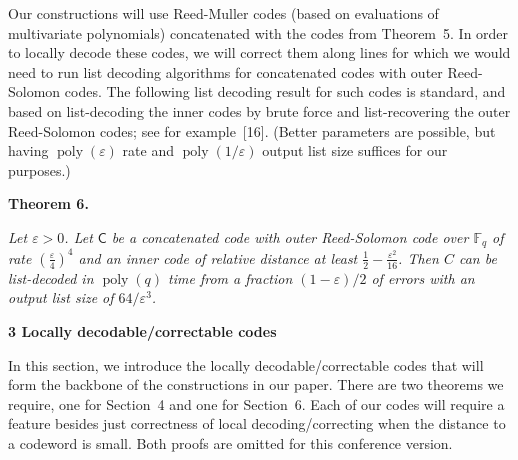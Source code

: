 


Our constructions will use Reed-Muller codes (based on evaluations of multivariate polynomials) concatenated with the codes from Theorem 5.
In order to locally decode these codes, we will correct them along lines for which we would need to run list decoding algorithms for concatenated codes with outer Reed-Solomon codes. The following list decoding result for such codes is standard, and based on list-decoding the inner codes by brute force and list-recovering the outer Reed-Solomon codes; see for example [16]. (Better parameters are possible, but having $\operatorname{poly}(\varepsilon)$ rate and $\operatorname{poly}(1/\varepsilon)$ output list size suffices for our purposes.)\par





\par\medskip\noindent\textbf{
\textbf{Theorem 6}\textbf{.}
}\par



\emph{Let $\varepsilon>0$. Let $\mathsf{C}$ be a concatenated code with outer Reed-Solomon code over ${\mathbb{F}}_{q}$ of rate $(\frac{\varepsilon}{4})^{4}$ and an inner code of relative distance at least $\tfrac{1}{2}-\tfrac{\varepsilon^{2}}{16}$. Then $C$ can be list-decoded in $\operatorname{poly}(q)$ time from a fraction $(1-\varepsilon)/2$ of errors with an output list size of $64/\varepsilon^{3}$.}\par








\par\medskip\noindent\textbf{
3 Locally decodable/correctable codes}\par




In this section, we introduce the locally decodable/correctable codes that will form the backbone of the constructions in our paper. There are two theorems we require, one for Section 4 and one for Section 6. Each of our codes will require a feature besides just correctness of local decoding/correcting when the distance to a codeword is small. Both proofs are omitted for this conference version.\par




